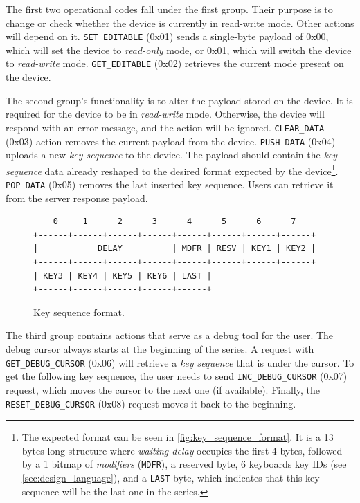 The first two operational codes fall under the first group. Their purpose is to change or check whether the device is currently in read-write mode. Other actions will depend on it. \verb|SET_EDITABLE| (0x01) sends a single-byte payload of 0x00, which will set the device to \emph{read-only} mode, or 0x01, which will switch the device to \emph{read-write} mode. \verb|GET_EDITABLE| (0x02) retrieves the current mode present on the device.

The second group's functionality is to alter the payload stored on the device. It is required for the device to be in \emph{read-write} mode. Otherwise, the device will respond with an error message, and the action will be ignored. \verb|CLEAR_DATA| (0x03) action removes the current payload from the device. \verb|PUSH_DATA| (0x04) uploads a new \emph{key sequence} to the device. The payload should contain the \emph{key sequence} data already reshaped to the desired format expected by the device\footnote{The expected format can be seen in \autoref{fig:key_sequence_format}. It is a 13 bytes long structure where \emph{waiting delay} occupies the first 4 bytes, followed by a 1 bitmap of \emph{modifiers} (\texttt{MDFR}), a reserved byte, 6 keyboards key IDs (see \autoref{sec:design_language}), and a \texttt{LAST} byte, which indicates that this key sequence will be the last one in the series.}. \verb|POP_DATA| (0x05) removes the last inserted key sequence. Users can retrieve it from the server response payload.

\begin{figure}[ht]
\centering
\begin{varwidth}{\linewidth}
\begin{verbatim}
    0     1      2      3      4      5      6      7
+------+------+------+------+------+------+------+------+
|            DELAY          | MDFR | RESV | KEY1 | KEY2 |
+------+------+------+------+------+------+------+------+
| KEY3 | KEY4 | KEY5 | KEY6 | LAST |
+------+------+------+------+------+
\end{verbatim}
\end{varwidth}
\caption{Key sequence format.}
\label{fig:key_sequence_format}
\end{figure}

The third group contains actions that serve as a debug tool for the user. The debug cursor always starts at the beginning of the series. A request with \verb|GET_DEBUG_CURSOR| (0x06) will retrieve a \emph{key sequence} that is under the cursor. To get the following key sequence, the user needs to send \verb|INC_DEBUG_CURSOR| (0x07) request, which moves the cursor to the next one (if available). Finally, the \verb|RESET_DEBUG_CURSOR| (0x08) request moves it back to the beginning.


